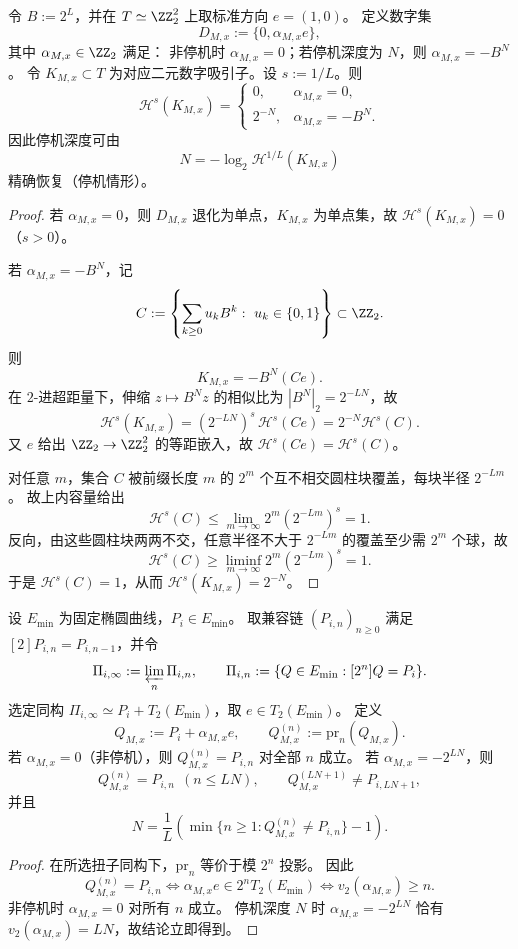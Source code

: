 \begin{theorem}\label{thm:xi-time-part9g-godel-leyang-hausdorff}
令 \(B:=2^L\)，并在 \(T\simeq\ZZ_2^2\) 上取标准方向 \(e=(1,0)\)。
定义数字集
\[
D_{M,x}:=\{0,\alpha_{M,x}e\},
\]
其中 \(\alpha_{M,x}\in\ZZ_2\) 满足：
非停机时 \(\alpha_{M,x}=0\)；若停机深度为 \(N\)，则 \(\alpha_{M,x}=-B^N\)。
令 \(K_{M,x}\subset T\) 为对应二元数字吸引子。设 \(s:=1/L\)。则
\[
\mathcal H^s(K_{M,x})=
\begin{cases}
0, & \alpha_{M,x}=0,\\[1mm]
2^{-N}, & \alpha_{M,x}=-B^N.
\end{cases}
\]
因此停机深度可由
\[
N=-\log_2\mathcal H^{1/L}(K_{M,x})
\]
精确恢复（停机情形）。
\end{theorem}
\begin{proof}
若 \(\alpha_{M,x}=0\)，则 \(D_{M,x}\) 退化为单点，\(K_{M,x}\) 为单点集，故 \(\mathcal H^s(K_{M,x})=0\)（\(s>0\)）。

若 \(\alpha_{M,x}=-B^N\)，记
\[
C:=\left\{\sum_{k\ge0}u_k B^k:\ u_k\in\{0,1\}\right\}\subset\ZZ_2.
\]
则
\[
K_{M,x}=-B^N(Ce).
\]
在 \(2\)-进超距量下，伸缩 \(z\mapsto B^N z\) 的相似比为 \(|B^N|_2=2^{-LN}\)，故
\[
\mathcal H^s(K_{M,x})=(2^{-LN})^s\,\mathcal H^s(Ce)=2^{-N}\mathcal H^s(C).
\]
又 \(e\) 给出 \(\ZZ_2\to\ZZ_2^2\) 的等距嵌入，故 \(\mathcal H^s(Ce)=\mathcal H^s(C)\)。

对任意 \(m\)，集合 \(C\) 被前缀长度 \(m\) 的 \(2^m\) 个互不相交圆柱块覆盖，每块半径 \(2^{-Lm}\)。
故上内容量给出
\[
\mathcal H^s(C)\le \lim_{m\to\infty}2^m(2^{-Lm})^s=1.
\]
反向，由这些圆柱块两两不交，任意半径不大于 \(2^{-Lm}\) 的覆盖至少需 \(2^m\) 个球，故
\[
\mathcal H^s(C)\ge \liminf_{m\to\infty}2^m(2^{-Lm})^s=1.
\]
于是 \(\mathcal H^s(C)=1\)，从而 \(\mathcal H^s(K_{M,x})=2^{-N}\)。
\end{proof}

\begin{proposition}[二进扭子链中的首次偏离深度判据]\label{prop:xi-time-part9g-first-deviation-depth}
设 \(E_{\min}\) 为固定椭圆曲线，\(P_i\in E_{\min}\)。
取兼容链 \((P_{i,n})_{n\ge0}\) 满足 \([2]P_{i,n}=P_{i,n-1}\)，并令
\[
\Pi_{i,\infty}:=\varprojlim_n\Pi_{i,n},
\qquad
\Pi_{i,n}:=\{Q\in E_{\min}:[2^n]Q=P_i\}.
\]
选定同构 \(\Pi_{i,\infty}\simeq P_i+T_2(E_{\min})\)，取 \(e\in T_2(E_{\min})\)。
定义
\[
Q_{M,x}:=P_i+\alpha_{M,x}e,\qquad
Q_{M,x}^{(n)}:=\mathrm{pr}_n(Q_{M,x}).
\]
若 \(\alpha_{M,x}=0\)（非停机），则 \(Q_{M,x}^{(n)}=P_{i,n}\) 对全部 \(n\) 成立。
若 \(\alpha_{M,x}=-2^{LN}\)，则
\[
Q_{M,x}^{(n)}=P_{i,n}\ \ (n\le LN),\qquad
Q_{M,x}^{(LN+1)}\neq P_{i,LN+1},
\]
并且
\[
N=\frac{1}{L}\left(\min\{n\ge1:Q_{M,x}^{(n)}\neq P_{i,n}\}-1\right).
\]
\end{proposition}
\begin{proof}
在所选扭子同构下，\(\mathrm{pr}_n\) 等价于模 \(2^n\) 投影。
因此
\[
Q_{M,x}^{(n)}=P_{i,n}
\Longleftrightarrow
\alpha_{M,x}e\in 2^nT_2(E_{\min})
\Longleftrightarrow
v_2(\alpha_{M,x})\ge n.
\]
非停机时 \(\alpha_{M,x}=0\) 对所有 \(n\) 成立。
停机深度 \(N\) 时 \(\alpha_{M,x}=-2^{LN}\) 恰有 \(v_2(\alpha_{M,x})=LN\)，故结论立即得到。
\end{proof}

